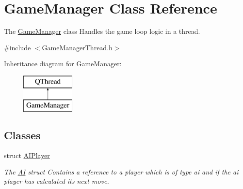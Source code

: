 \hypertarget{classGameManager}{\section{Game\-Manager Class Reference}
\label{classGameManager}
}


The \hyperlink{classGameManager}{Game\-Manager} class Handles the game loop logic in a thread.  




{\ttfamily \#include $<$Game\-Manager\-Thread.\-h$>$}

Inheritance diagram for Game\-Manager\-:\begin{figure}[H]
\begin{center}
\leavevmode
\includegraphics[height=2.000000cm]{classGameManager}
\end{center}
\end{figure}
\subsection*{Classes}
\begin{DoxyCompactItemize}
\item 
struct \hyperlink{structGameManager_1_1AIPlayer}{A\-I\-Player}
\begin{DoxyCompactList}\small\item\em The \hyperlink{classAI}{A\-I} struct Contains a reference to a player which is of type ai and if the ai player has calculated its next move. \end{DoxyCompactList}\end{DoxyCompactItemize}

